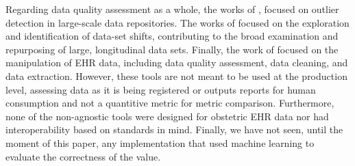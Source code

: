 Regarding data quality assessment as a whole, the works of \cite{estiriSemisupervisedEncodingOutlier2019}, focused on outlier detection in large-scale data repositories. The works of \cite{saezEHRtemporalVariabilityDelineatingTemporal2020} focused on the exploration and identification of data-set shifts, contributing to the broad examination and repurposing of large, longitudinal data sets. Finally, the work of \cite{springateREHRPackageManipulating2017} focused on the manipulation of EHR data, including data quality assessment, data cleaning, and data extraction.
However, these tools are not meant to be used at the production level, assessing data as it is being registered or outputs reports for human consumption and not a quantitive metric for metric comparison. Furthermore, none of the non-agnostic tools were designed for obstetric EHR data nor had interoperability based on standards in mind. Finally, we have not seen, until the moment of this paper, any implementation that used machine learning to evaluate the correctness of the value.